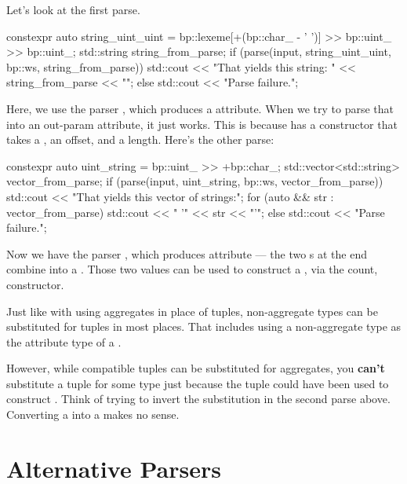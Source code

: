 \documentclass{MyBook}
\begin{document}
Let's look at the first parse.

\begin{code}
constexpr auto string_uint_uint =
    bp::lexeme[+(bp::char_ - ' ')] >> bp::uint_ >> bp::uint_;
std::string string_from_parse;
if (parse(input, string_uint_uint, bp::ws, string_from_parse))
    std::cout << "That yields this string: " << string_from_parse << "\n";
else
    std::cout << "Parse failure.\n";
\end{code}

Here, we use the parser , which produces a  attribute. When we try to parse that into an out-param  attribute, it just works. This is because  has a constructor that takes a , an offset, and a length. Here's the other parse:

\begin{code}
constexpr auto uint_string = bp::uint_ >> +bp::char_;
std::vector<std::string> vector_from_parse;
if (parse(input, uint_string, bp::ws, vector_from_parse)) {
    std::cout << "That yields this vector of strings:\n";
    for (auto && str : vector_from_parse) {
        std::cout << "  '" << str << "'\n";
    }
} else {
    std::cout << "Parse failure.\n";
}
\end{code}

Now we have the parser , which produces  attribute --- the two s at the end combine into a . Those two values can be used to construct a , via the count,  constructor.

Just like with using aggregates in place of tuples, non-aggregate  types can be substituted for tuples in most places. That includes using a non-aggregate  type as the attribute type of a .

However, while compatible tuples can be substituted for aggregates, you \textbf{can't} substitute a tuple for some  type  just because the tuple could have been used to construct . Think of trying to invert the substitution in the second parse above. Converting a  into a  makes no sense.

\section{Alternative Parsers}
\end{document}
